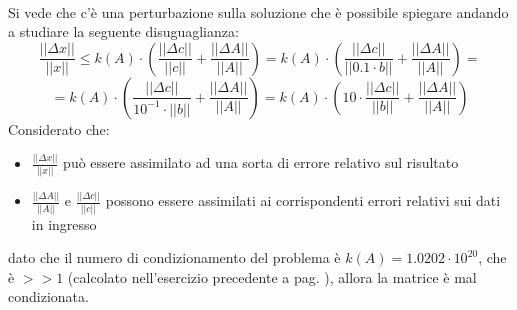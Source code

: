 \begin{flushleft}
\begin{figure}[h]
\end{figure}
\newline \\
Si vede che c'è una perturbazione sulla soluzione che è possibile spiegare andando a studiare la seguente disuguaglianza:
\[
\frac{\left|\left|\Delta x\right|\right|}{\left|\left|x\right|\right|} \leq k(A) \cdot \left(\frac{\left|\left|\Delta c\right|\right|}{\left|\left|c\right|\right|} + \frac{\left|\left|\Delta A\right|\right|}{\left|\left|A\right|\right|}\right) = k(A) \cdot \left(\frac{\left|\left|\Delta c\right|\right|}{\left|\left|0.1\cdot b\right|\right|} + \frac{\left|\left|\Delta A\right|\right|}{\left|\left|A\right|\right|}\right) = 
\]
\[
= k(A) \cdot \left(\frac{\left|\left|\Delta c\right|\right|}{10^{-1}\cdot\left|\left|b\right|\right|} + \frac{\left|\left|\Delta A\right|\right|}{\left|\left|A\right|\right|}\right) = k(A) \cdot \left(10\cdot\frac{\left|\left|\Delta c\right|\right|}{\left|\left|b\right|\right|} + \frac{\left|\left|\Delta A\right|\right|}{\left|\left|A\right|\right|}\right) 
\]
Considerato che:
\begin{itemize}
    \item $\frac{\left|\left|\Delta x\right|\right|}{\left|\left|x\right|\right|}$ può essere assimilato ad una sorta di errore relativo sul risultato
    \item $\frac{\left|\left|\Delta A\right|\right|}{\left|\left|A\right|\right|}$ e $\frac{\left|\left|\Delta c\right|\right|}{\left|\left|c\right|\right|}$ possono essere assimilati ai corrispondenti errori relativi sui dati in ingresso
\end{itemize}
dato che il numero di condizionamento del problema è $k(A)=1.0202\cdot10^{20}$, che è $>>1$ (calcolato nell'esercizio precedente a pag. \pageref{es315}), allora la matrice è mal condizionata.
\end{flushleft}